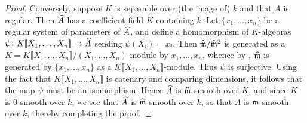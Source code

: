 \begin{proof}
    Conversely, suppose $K$ is separable over (the image of) $k$ and that $A$ is regular. Then $\widehat{A}$ has a coefficient field $K$ containing $k$. Let $\{x_1,\dots,  x_n\}$ be a regular system of parameters of $\widehat{A}$, and define a homomorphism of $K$-algebras $\psi\colon K\llbracket X_1,\dots, X_n\rrbracket \to \widehat{A}$ sending $\psi(X_i) = x_i$. Then $\widehat{\mathfrak{m}}/\widehat{\mathfrak{m}}^2$ is generated as a $K = K\llbracket X_1,\dots, X_n\rrbracket/(X_1,\dots, X_n)$-module by $x_1,\dots,x_n$, whence by , $\widehat{\mathfrak{m}}$ is generated by $\{x_1,\dots,x_n\}$ as a $K\llbracket X_1,\dots,X_n\rrbracket$-module. Thus $\psi$ is surjective. Using the fact that $K\llbracket X_1,\dots,X_n\rrbracket$ is catenary and comparing dimensions, it follows that the map $\psi$ must be an isomorphism. Hence $\widehat{A}$ is $\widehat{\mathfrak{m}}$-smooth over $K$, and since $K$ is $0$-smooth over $k$, we see that $\widehat{A}$ is $\widehat{\mathfrak{m}}$-smooth over $k$, so that $A$ is $\mathfrak{m}$-smooth over $k$, thereby completing the proof.
\end{proof}



